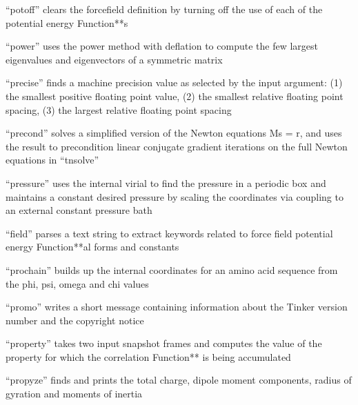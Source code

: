 \documentclass[letterpaper,11pt,english]{sphinxmanual}
\begin{document}
“potoff” clears the forcefield definition by turning off the use of each of the potential energy Function**s


“power” uses the power method with deflation to compute the few largest eigenvalues and eigenvectors of a symmetric matrix


“precise” finds a machine precision value as selected by the input argument: (1) the smallest positive floating point value, (2) the smallest relative floating point spacing, (3) the largest relative floating point spacing


“precond” solves a simplified version of the Newton equations Ms = r, and uses the result to precondition linear conjugate gradient iterations on the full Newton equations in “tnsolve”


“pressure” uses the internal virial to find the pressure in a periodic box and maintains a constant desired pressure by scaling the coordinates via coupling to an external constant pressure bath


“field” parses a text string to extract keywords related to force field potential energy Function**al forms and constants


“prochain” builds up the internal coordinates for an amino acid sequence from the phi, psi, omega and chi values



“promo” writes a short message containing information about the Tinker version number and the copyright notice


“property” takes two input snapshot frames and computes the value of the property for which the correlation Function** is being accumulated


“propyze” finds and prints the total charge, dipole moment components, radius of gyration and moments of inertia
\end{document}
